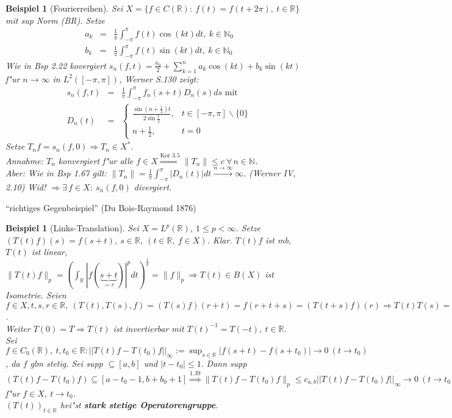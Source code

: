 \documentclass[a4paper,11pt]{book}
\newcommand{\R}{{\mathbb R}}
\newcommand{\N}{{\mathbb N}}
\newcommand{\sn}[1]{||#1||_{\infty}}
\newcommand{\begriff}[1]{\textbf{#1}} %
\newtheorem{Bsp}[Def]{Beispiel}
\theoremstyle{nonumberplain}
\begin{document}
\begin{Bsp}[Fourierreihen]
Sei $X = \{ f \in C(\R):\ f(t) = f(t + 2\pi),\ t \in \R\}$ mit sup Norm (BR). Setze
\begin{eqnarray*}
a_k & = & \frac1{\pi} \int_{-\pi}^{\pi} f(t) \cos(kt) dt,\ k \in \N_0\\
b_k & = & \frac1{\pi} \int_{-\pi}^{\pi} f(t) \sin(kt) dt,\ k \in \N_0
\end{eqnarray*}
Wie in Bsp 2.22 kovergiert $s_n(f,t) = \frac{a_0}2 + \sum_{k=1}^n a_k \cos(kt) + b_k \sin(kt)$ f"ur $n \rightarrow \infty$ in $L^2([-\pi,\pi])$, Werner S.130 zeigt:
\begin{eqnarray*}
s_n(f,t) & = & \frac1{\pi} \int_{-\pi}^{\pi} f_n(s+t) D_n(s) ds \text{  mit} \\
D_n(t) & = & \begin{cases}
\frac{\sin(n+\frac12)t}{2 \sin \frac{t}2} , & t \in [-\pi,\pi] \backslash \{0\} \\
n + \frac12, & t = 0
\end{cases}
\end{eqnarray*}
Setze $T_nf = s_n(f,0) \Rightarrow T_n \in X^{\ast}$.\\
Annahme: $T_n$ konvergiert f"ur alle $f \in X \stackrel{\text{Kor 3.5}}{\Rightarrow} \|T_n\| \leq c \ \forall\, n \in \N$.\\
Aber: Wie in Bsp 1.67 gilt: $\|T_n\| = \frac1{\pi} \int_{-\pi}^{\pi} |D_n(t)| dt \stackrel{n \rightarrow \infty}{\rightarrow} \infty$. (Werner IV, 2.10) Wid! $\Rightarrow \exists\, f \in X:\ s_n(f,0)$ divergiert.
\end{Bsp}

``richtiges Gegenbeispiel'' (Du Bois-Raymond 1876)

\begin{Bsp}[Links-Translation]
Sei $X = L^p(\R),\ 1 \leq p < \infty$. Setze $(T(t)f)(s) = f(s+t),\ s \in \R,\ (t \in \R,\ f \in X)$. Klar. $T(t)f$ ist mb, $T(t)$ ist linear, $\|T(t)f\|_p = (\int_{\R} |f(\underbrace{s+t}_{= r})|^p dt)^{\frac1{p}} = \|f\|_p \Rightarrow T(t) \in B(X)$ ist Isometrie. Seien $f \in X,t,s,r \in \R,\ (T(t),T(s),f) = (T(s)f)(r+t) = f(r+t+s) = (T(t+s)f)(r) \Rightarrow T(t)T(s) = T(t+s) = T(s)T(t)$.\\
Weiter $T(0) = T \Rightarrow T(t)$ ist invertierbar mit $T(t)^{-1} = T(-t),\ t \in \R$.\\
Sei $f \in C_0(\R),\ t,t_0 \in \R: \sn{T(t)f - T(t_0)f} := \sup_{s \in \R} |f(s+t) - f(s+t_0)| \rightarrow 0\ (t \rightarrow t_0)$, da $f$ glm stetig. Sei supp $\subseteq [a,b]$ und $|t-t_0| \leq 1.$ Dann supp $(T(t)f - T(t_0)f) \subseteq [a-t_0-1,b+b_0+1] \stackrel{1.39}{\Rightarrow} \|T(t)f - T(t_0)f\|_p \leq c_{a,b} \sn{T(t)f - T(t_0)f} \rightarrow 0\ (t \rightarrow t_0) \stackrel{\text{Kor 3.5,Sa 1.44}}{\Longrightarrow} T(t)(f) \rightarrow T(t_0)f$ f"ur $f \in X,\ t \rightarrow t_0$.\\
$(T(t))_{t \in \R}$ hei"st \begriff{stark stetige Operatorengruppe}.
\end{Bsp}
\end{document}
